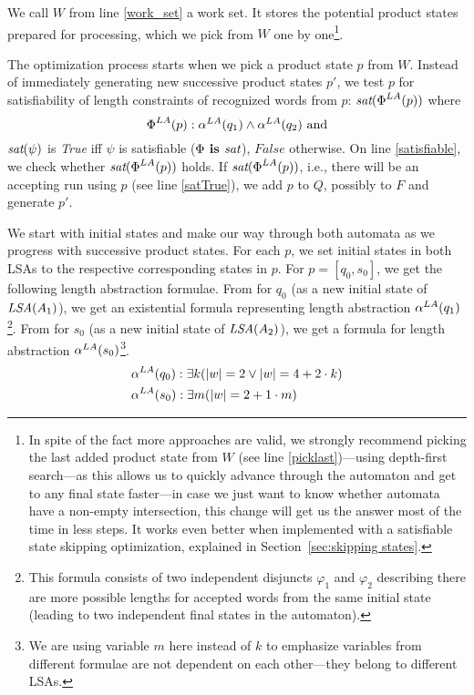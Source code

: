 We call $W$ from line \ref{work_set} a work set. It stores the potential product states prepared for processing, which we pick from $W$ one by one\footnote{In spite of the fact more approaches are valid, we strongly recommend picking the last added product state from $W$ (see line \ref{picklast})---using depth-first search---as this allows us to quickly advance through the automaton and get to any final state faster---in case we just want to know whether automata have a non-empty intersection, this change will get us the answer most of the time in less steps. It works even better when implemented with a satisfiable state skipping optimization, explained in Section~\ref{sec:skipping states}.}.

The optimization process starts when we pick a product state $p$ from $W$. Instead of immediately generating new successive product states $p'$, we test $p$ for satisfiability of length constraints of recognized words from $p$: $\emph{sat}(\emph{$\Phi$}^{LA}(p))$ where
\[
    \emph{$\Phi$}^{LA}(p) : \alpha^{LA}(q_1) \wedge \alpha^{LA}(q_2) \text{ and}
\]
$\emph{sat}(\psi)$ is \emph{True} iff $\psi$ is satisfiable ($\Phi \textbf{ is } \emph{sat}$), $False$ otherwise. On line \ref{satisfiable}, we check whether $\emph{sat}(\emph{$\Phi$}^{LA}(p))$ holds. If $\emph{sat}(\emph{$\Phi$}^{LA}(p))$, i.e., there will be an accepting run using $p$ (see line \ref{satTrue}), we add $p$ to $Q$, possibly to $F$ and generate $p'$.

We start with initial states and make our way through both automata as we progress with successive product states. For each $p$, we set initial states in both LSAs to the respective corresponding states in $p$. For $p = [q_0, s_0]$, we get the following length abstraction formulae. From  for $q_0$ (as a new initial state of $\emph{LSA}(A_1)$), we get an existential formula representing length abstraction $\alpha^{LA}(q_1)$\footnote{This formula consists of two independent disjuncts $\varphi_1$ and $\varphi_2$ describing there are more possible lengths for accepted words from the same initial state (leading to two independent final states in the automaton).}. From  for $s_0$ (as a new initial state of $\emph{LSA}(A_2)$), we get a formula for length abstraction $\alpha^{LA}(s_0)$\footnote{We are using variable $m$ here instead of $k$ to emphasize variables from different formulae are not dependent on each other---they belong to different LSAs.}.
\begin{align*}
    &\alpha^{LA}(q_0): \exists k ( |w| = 2 \lor |w| = 4 + 2 \cdot k ) \\
    &\alpha^{LA}(s_0): \exists m ( |w| = 2 + 1 \cdot m )
\end{align*}

